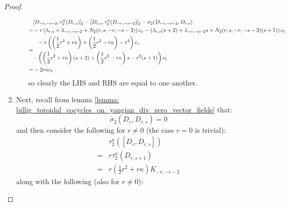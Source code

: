 \begin{proof}
\begin{enumerate}
\begin{enumerate}
$$\begin{aligned}
                                    & [D_{-r, -s - 2}, \tau_2^{\kappa}(D_{r, s})]_{\hat{\mathfrak{t}}} - [D_{r, s}, \tau_2^{\kappa}(D_{-r, -s - 2})]_{\hat{\mathfrak{t}}} - \sigma_2(D_{-r, -s - 2}, D_{r, s})
                                    \\
                                    = & -r\left( \lambda_{r, s} + \lambda_{-r, -s - 2} + N_2(r, s, -r, -s - 2) \right) c_v - \left( \lambda_{r, s} (s + 2) + \lambda_{-r, -s - 2} s + N_2(r, s, -r, -s - 2) (s + 1) \right) c_t
                                    \\
                                    = &
                                    \begin{aligned}
                                        & -r \left( \left( \frac12 r^2 + r \kappa \right) + \left( \frac12 r^2 - r \kappa \right) - r^2\right) c_v
                                        \\
                                        - & \left( \left( \frac12 r^2 + r \kappa \right) (s + 2) + \left( \frac12 r^2 - r \kappa \right) s - r^2 (s + 1) \right) c_t
                                    \end{aligned}
                                    \\
                                    = & -2r \kappa c_t
                                \end{aligned}
                            $$
                        so clearly the LHS and RHS are equal to one another.
                    \end{enumerate}
                    \item Next, recall from lemma \ref{lemma: billig_toroidal_cocycles_on_yangian_div_zero_vector_fields} that:
                        $$\sigma_2(D_v, D_{r, s}) = 0$$
                    and then consider the following for $r \not = 0$ (the case $r = 0$ is trivial):
                        $$
                            \begin{aligned}
                                & \tau_2^{\kappa}([D_v, D_{r, s}])
                                \\
                                = & r\tau_2^{\kappa}(D_{r, s + 1})
                                \\
                                = & r \left(\frac12 r^2 + r \kappa \right) K_{-r, -s - 2}
                            \end{aligned}
                        $$
                    along with the following (also for $r \not = 0$):
                        $$
$$
\end{enumerate}
\end{proof}
